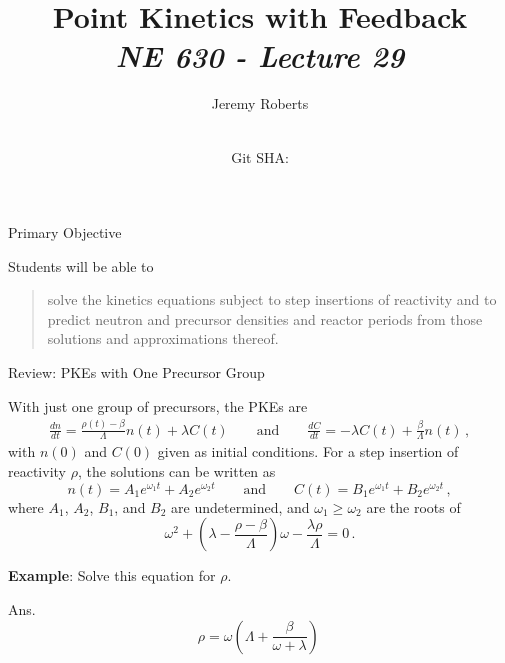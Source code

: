 \documentclass[aspectratio=1610]{beamer}
\title{Point Kinetics with Feedback \\
       {\small\it NE 630 - Lecture 29}}
\date{ \\ {\footnotesize Git SHA: }}
\author{Jeremy Roberts}
\begin{document}
\begin{frame}
\titlepage
\end{frame}
 
 
\begin{frame}{Primary Objective}

Students will be able to 

\vfill

\begin{quote}
\textcolor{wcprimary}{solve the kinetics equations subject to step insertions of reactivity and to predict neutron and precursor densities and reactor periods from those solutions and approximations thereof. 
}
\end{quote}

\vfill 

\end{frame}

\begin{frame}[fragile]{Review: PKEs with One Precursor Group}

With just one group of precursors, the PKEs are
\begin{align*}
 \frac{dn}{dt} = \frac{\rho(t)-\beta}{\Lambda}n(t) + \lambda C(t) \qquad \text{and} \qquad
 \frac{dC}{dt} = -\lambda C(t) + \frac{\beta}{\Lambda} n(t) \, ,
\end{align*}
with $n(0)$ and $C(0)$ given as initial conditions.   
For a step insertion of reactivity $\rho$, the solutions can be written as
\begin{equation*}
  n(t) = A_1 e^{\omega_1 t} + A_2 e^{\omega_2 t} \qquad \text{and} \qquad 
  C(t) = B_1 e^{\omega_1 t} + B_2 e^{\omega_2 t} \, , 
\end{equation*}
where $A_1$, $A_2$, $B_1$, and $B_2$ are undetermined, and $\omega_1 \geq \omega_2$ are the roots of
\begin{equation*}
 \omega^2 + 
         \left (\lambda - \frac{\rho - \beta}{\Lambda} \right ) \omega -
           \frac{\lambda \rho}{\Lambda}  = 0  \, .
\end{equation*}

\vfill
\pause 

{\bf Example}: Solve this equation for $\rho$. \pause 

\textcolor{wcprimary}{Ans. 
\begin{equation*}
\tag{``One-Group Inhour Equation''}
\boxed{\rho = \omega \left ( \Lambda + \frac{\beta}{\omega+\lambda} \right )} \, 
\end{equation*}
}

\end{frame}
\end{document}
